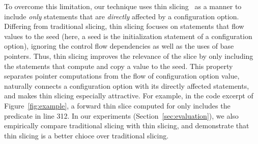
To overcome this limitation, our technique uses thin
slicing~\cite{Sridharan:2007} as a manner to include
\textit{only} statements that are \textit{directly} affected by a configuration option.
Differing from traditional slicing, thin slicing
focuses on statements that flow values to the seed (here, a
seed is the initialization statement of a configuration option), ignoring the 
control flow dependencies as well as the uses of
base pointers. Thus, thin slicing improves the relevance
of the slice by only including the statements that compute
and copy a value to the seed.
This property separates
pointer computations from the flow of configuration option value,
naturally connects a configuration option with its
directly affected statements, and makes thin slicing
especially attractive.
For example, in the code excerpt of Figure~\ref{fig:example},
a forward thin slice computed for 
only includes the predicate in line 312.
In our experiments (Section~\ref{sec:evaluation}), 
we also empirically compare traditional slicing with
thin slicing, and demonstrate that thin slicing is a better chioce
over traditional slicing.




% 
